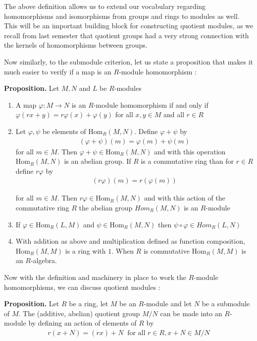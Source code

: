 \documentclass[11pt, reqno]{amsart}
\theoremstyle{plain}
\theoremstyle{definition}
\theoremstyle{example}
\def\Hom{\mathrm{Hom}}
\begin{document}
The above definition allows us to extend our vocabulary regarding homomorphisms and isomorphisms from groups and rings to modules as well. This will be an important building block for constructing quotient modules, as we recall from last semester that quotient groups had a very strong connection with the kernels of homomorphisms between groups.

\par
Now similarly, to the submodule criterion, let us state a proposition that makes it much easier to verify if a map is an $R$-module homomorphism \cite[\S 10.2, p. 346]{dummit}:

\par
\textbf{Proposition.} Let $M, N$ and $L$ be $R$-modules
\begin{enumerate}
\item A map $\varphi: M \to N$ is an $R$-module homomorphism if and only if $\varphi(rx + y) =r\varphi(x) + \varphi(y)$ for all $x, y \in M$ and all $r \in R$
\item Let $\varphi, \psi$ be elements of $\Hom_R(M,N)$. Define $\varphi + \psi$ by
\begin{align*}
(\varphi + \psi)(m) = \varphi(m) + \psi(m)
\end{align*}
for all $m \in M$. Then $\varphi + \psi \in \Hom_R(M, N)$ and with this operation $\Hom_R(M, N)$ is an abelian group. If $R$ is a commutative ring than for $r \in R$ define $r\varphi$ by 
\begin{align*}
(r\varphi)(m) = r(\varphi(m))
\end{align*}

for all $m \in M$. Then $r\varphi \in \Hom_R(M, N)$ and with this action of the commutative ring $R$ the abelian group $Hom_R(M, N)$ is an $R$-module
\item If $\varphi \in \Hom_R(L, M)$ and $\psi \in \Hom_R(M, N)$ then $\psi \circ \varphi \in Hom_R(L, N)$
\item With addition as above and multiplication defined as function composition, $\Hom_R(M, M)$ is a ring with $1$. When $R$ is commutative $\Hom_R(M, M)$ is an $R$-algebra.
\end{enumerate}

Now with the definition and machinery in place to work the $R$-module homomorphisms, we can discuss quotient modules \cite[\S 10.2, p. 348]{dummit}:

\par
\textbf{Proposition.} Let $R$ be a ring, let $M$ be an $R$-module and let $N$ be a submodule of $M$. The (additive, abelian) quotient group $M/N$ can be made into an $R$-module by defining an action of elements of $R$ by
\begin{align*}
r(x+N) = (rx) + N \; \; \text{for all } r \in R, x+N \in M/N
\end{align*}
\end{document}
